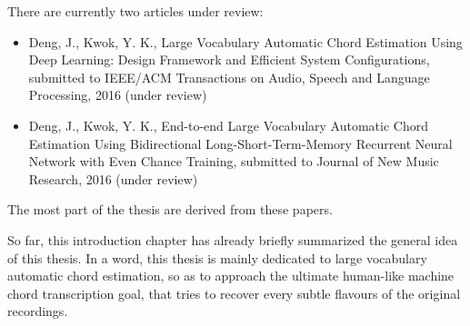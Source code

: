 There are currently two articles under review:
\begin{itemize}
\item Deng, J., Kwok, Y. K., Large Vocabulary Automatic Chord Estimation Using Deep Learning: Design Framework and Efficient System Configurations, submitted to IEEE/ACM Transactions on Audio, Speech and Language Processing, 2016 (under review)
\item Deng, J., Kwok, Y. K., End-to-end Large Vocabulary Automatic Chord Estimation Using Bidirectional Long-Short-Term-Memory Recurrent Neural Network with Even Chance Training, submitted to Journal of New Music Research, 2016 (under review)
\end{itemize}
The most part of the thesis are derived from these papers.

So far, this introduction chapter has already briefly summarized the general idea of this thesis. In a word, this thesis is mainly dedicated to large vocabulary automatic chord estimation, so as to approach the ultimate human-like machine chord transcription goal, that tries to recover every subtle flavours of the original recordings.












